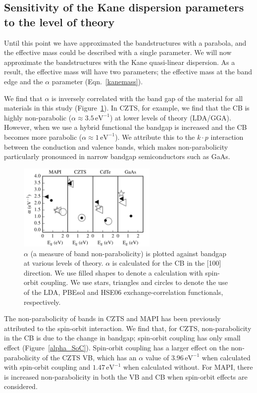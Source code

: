 \subsection{Sensitivity of the Kane dispersion parameters to the level of theory}

Until this point we have approximated the bandstructures with a parabola, and the effective mass could be described with a single parameter.
We will now approximate the bandstructures with the Kane quasi-linear dispersion. As a result, the effective mass will have two parameters; the effective mass at the band edge and the $\alpha$ parameter (Eqn.\ \ref{kanemass}).

We find that $\alpha$ is inversely correlated with the band gap of the material for all materials in this study (Figure\ \ref{alpha_bandgap_plot}). 
In CZTS, for example, we find that the CB is highly non-parabolic ($\alpha\approx3.5\,\textrm{eV}^{-1}$) at lower levels of theory (LDA/GGA).
However, when we use a hybrid functional the bandgap is increased and the CB becomes more parabolic ($\alpha\approx1\,\textrm{eV}^{-1}$).
We attribute this to the $k\cdot p$ interaction between the conduction and valence bands,\autocite{Kane1957} which makes non-parabolicity particularly pronounced in narrow bandgap semiconductors such as GaAs.\autocite{Szmyd1990}

\begin{figure}[tb] \centering
\includegraphics[width=0.6\textwidth]{./figures/ch4/alpha_bandgap_plot.pdf}
\caption[Band non-parabolicity vs bandgap]{\label{alpha_bandgap_plot}$\alpha$ (a measure of band non-parabolicity) is plotted against bandgap at various levels of theory. $\alpha$ is calculated for the CB in the [100] direction. We use filled shapes to denote a calculation with spin-orbit coupling. We use stars, triangles and circles to denote the use of the LDA, PBEsol and HSE06 exchange-correlation functionals, respectively. }
\end{figure}

The non-parabolicity of bands in CZTS\autocite{Ito2015} and MAPI\autocite{Brivio2014,Mosconi2017} has been previously attributed to the spin-orbit interaction. 
We find that, for CZTS, non-parabolicity in the CB is due to the change in bandgap; spin-orbit coupling has only small effect (Figure\ \ref{alpha_SoC}). 
Spin-orbit coupling has a larger effect on the non-parabolicity of the CZTS VB, which has an $\alpha$ value of $3.96\,\textrm{eV}^{-1}$ when calculated with spin-orbit coupling and $1.47\,\textrm{eV}^{-1}$ when calculated without. 
For MAPI, there is increased non-parabolicity in both the VB and CB when spin-orbit effects are considered. 

